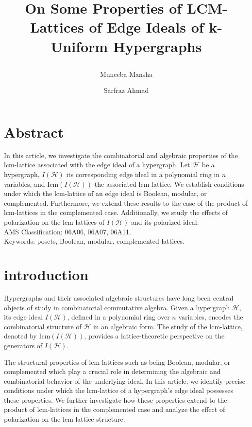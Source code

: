 \documentclass[11pt]{amsart}
\title{{\parbox{\textwidth}{\centering %
 On Some Properties of LCM-Lattices of Edge Ideals of k-Uniform Hypergraphs}}}
\author[Muneeba]{Muneeba Mansha}
\author[S. Ahmad]{Sarfraz Ahmad}
\newcommand{\lcm}{\mathrm{lcm}}
\theoremstyle{plain}
\numberwithin{lemma}{\DefaultNumberTheoremWithin}
\numberwithin{claim}{\DefaultNumberTheoremWithin}
\numberwithin{theorem}{\DefaultNumberTheoremWithin}
\numberwithin{corollary}{\DefaultNumberTheoremWithin}
\numberwithin{proposition}{\DefaultNumberTheoremWithin}
\numberwithin{conjecture}{\DefaultNumberTheoremWithin}
\theoremstyle{definition}
\numberwithin{definition}{\DefaultNumberTheoremWithin}
\theoremstyle{definition}
\numberwithin{question}{\DefaultNumberTheoremWithin}
\theoremstyle{definition}
\numberwithin{problem}{\DefaultNumberTheoremWithin}
\theoremstyle{remark}
\numberwithin{remark}
     {\DefaultNumberTheoremWithin}
\theoremstyle{remark}
\numberwithin{example}{\DefaultNumberTheoremWithin}
\def\H{\mathcal {H}}
\begin{document}
\maketitle
\section{Abstract}
In this article, we investigate the combinatorial and algebraic properties of the lcm-lattice associated with the edge ideal of a hypergraph. Let $\H$ be a hypergraph, $I(\H)$ its corresponding edge ideal in a polynomial ring in $n$ variables, and $\mathrm{Icm}(I(\H))$ the associated lcm-lattice. We establish conditions under which the lcm-lattice of an edge ideal is Boolean, modular, or complemented. Furthermore, we extend these results to the case of the product of lcm-lattices in the complemented case. Additionally, we study the effects of polarization on the lcm-lattices of $I(\H)$ and its polarized ideal.\\
AMS Classification: 06A06, 06A07, 06A11.\\
Keywords: posets, Boolean, modular, complemented lattices.



\section{introduction}
  Hypergraphs and their associated algebraic structures have long been central objects of study in combinatorial commutative algebra. Given a hypergraph $\mathcal{H}$, its edge ideal $I(\mathcal{H})$, defined in a polynomial ring over $n$ variables, encodes the combinatorial structure of $\mathcal{H}$ in an algebraic form. The study of the $\lcm$-lattice, denoted by $\mathrm{Icm}(I(\mathcal{H}))$, provides a lattice-theoretic perspective on the generators of $I(\mathcal{H})$.

The structural properties of $\lcm$-lattices such as being Boolean, modular, or complemented which play a crucial role in determining the algebraic and combinatorial behavior of the underlying ideal. In this article, we identify precise conditions under which the $\lcm$-lattice of a hypergraph's edge ideal possesses these properties. We further investigate how these properties extend to the product of $\lcm$-lattices in the complemented case and analyze the effect of polarization on the $\lcm$-lattice structure.
\end{document}
